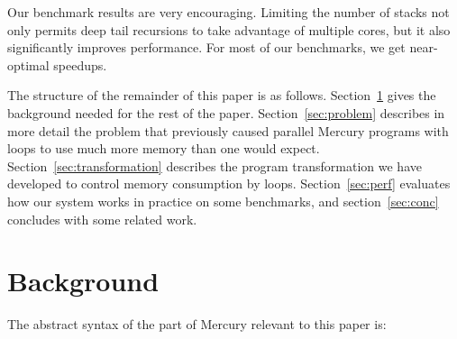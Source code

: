 Our benchmark results are very encouraging.
Limiting the number of stacks
not only permits deep tail recursions to take advantage of multiple cores,
but it also significantly improves performance.
For most of our benchmarks, we get near-optimal speedups.

The structure of the remainder of this paper is as follows.
Section~\ref{sec:background} gives
the background needed for the rest of the paper.
Section~\ref{sec:problem} describes in more detail
the problem that previously caused parallel Mercury programs with loops
to use much more memory than one would expect.
Section~\ref{sec:transformation} describes
the program transformation we have developed
to control memory consumption by loops.
Section~\ref{sec:perf} evaluates
how our system works in practice on some benchmarks,
and
section~\ref{sec:conc} concludes with some related work.

\section{Background}
\label{sec:background}



The abstract syntax of the part of Mercury relevant to this paper is:

